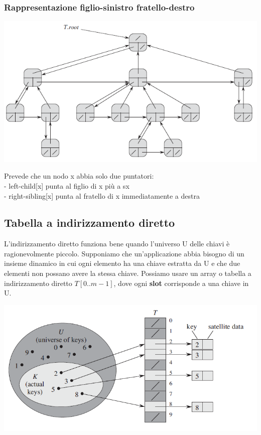 \documentclass[11pt,a4paper]{article}
\begin{document}
\subsubsection{Rappresentazione figlio-sinistro fratello-destro}
\begin{center}
      \includegraphics[scale=.4]{img/figliosxfratellodx.png}
\end{center}
Prevede che un nodo x abbia solo due puntatori:\\
- left-child[x] punta al figlio di x più a sx\\
- right-sibling[x] punta al fratello di x immediatamente a destra

\subsection{Tabella a indirizzamento diretto}
L’indirizzamento diretto funziona bene quando l’universo U delle chiavi è ragionevolmente
piccolo.
Supponiamo che un’applicazione abbia bisogno di un insieme dinamico in cui ogni
elemento ha una chiave estratta da U e che due elementi non possano avere la stessa
chiave. Possiamo usare un array o tabella a indirizzamento diretto $T[0 .. m-1]$, dove ogni
\textbf{slot} corrisponde a una chiave in U.
\begin{center}
      \includegraphics[scale=0.4]{img/indirizzamentodiretto.png}
\end{center}
\end{document}
